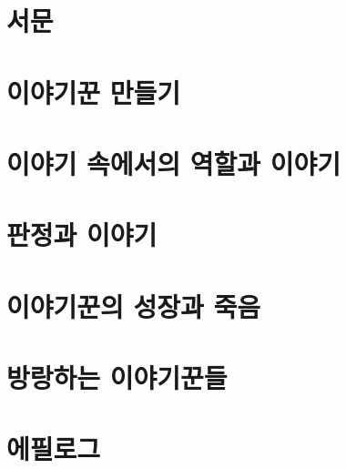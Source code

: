 \documentclass{report}
\begin{document}
	\parttoc
	
	\chapter{서문}
	
	
	\chapter{이야기꾼 만들기}
	
	
	\chapter{이야기 속에서의 역할과 이야기}
	
	
	\chapter{판정과 이야기}
	
	
	\chapter{이야기꾼의 성장과 죽음}
	
	
	\hypertarget{wandering-storytellers}{}
	\chapter{방랑하는 이야기꾼들}
	
	
	\chapter{에필로그}
	
\end{document}
